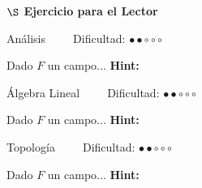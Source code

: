 


\begin{center}
    {\large \textbf{ $\S$ Ejercicio para el Lector}}
\end{center}

\begin{center}
    Análisis $~~~~~~~~$ Dificultad: $\bullet \bullet \circ \circ\circ $
\end{center}

{\fontsize{7}{5} 
Dado $F$ un campo...
\textbf{Hint:}
}

\begin{center}
    Álgebra Lineal $~~~~~~~~$ Dificultad: $\bullet \bullet \circ \circ\circ $
\end{center}

{\fontsize{7}{5} 
Dado $F$ un campo...
\textbf{Hint:}
}

\begin{center}
    Topología $~~~~~~~~$ Dificultad: $\bullet \bullet \circ \circ\circ $
\end{center}

{\fontsize{7}{5} 
Dado $F$ un campo...
\textbf{Hint:}
}

